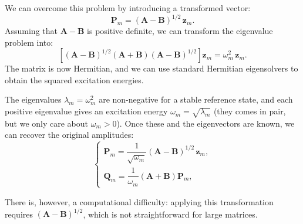 \documentclass[10pt,aspectratio=169]{beamer}
\begin{document}
\begin{frame}
	We can overcome this problem by introducing a transformed vector:
	\begin{equation*}
		\mathbf P_m=(\mathbf A-\mathbf B)^{1/2}\,\mathbf z_m.
	\end{equation*}
	\pause
	Assuming that $\mathbf A-\mathbf B$ is positive definite, we can transform the eigenvalue problem into:
	\begin{equation}
		\boxed{
			\left[(\mathbf A-\mathbf B)^{1/2}(\mathbf A+\mathbf B)(\mathbf A-\mathbf B)^{1/2}\right]\mathbf z_m
			=\omega_m^2\,\mathbf z_m.
		} \label{eq:casida-x}
	\end{equation}
	The matrix is now Hermitian, and we can use standard Hermitian eigensolvers to obtain the squared excitation energies.
	
	\pause
	\medskip
	The eigenvalues $\lambda_m = \omega_m^2$ are non-negative for a stable reference state, and each positive eigenvalue gives an excitation energy $\omega_m=\sqrt{\lambda_m}$ (they comes in pair, but we only care about $\omega_m > 0$).
	Once these and the eigenvectors are known, we can recover the original amplitudes:
	\begin{equation*}
		\begin{cases}
			\mathbf P_m=\dfrac{1}{\sqrt{\omega_m}}(\mathbf A-\mathbf B)^{1/2}\,\mathbf z_m,\\
			\mathbf Q_m=\dfrac{1}{\omega_m}(\mathbf A+\mathbf B)\mathbf P_m,
		\end{cases}
	\end{equation*}
	
	\medskip
	There is, however, a computational difficulty: applying this transformation requires $(\mathbf A-\mathbf B)^{1/2}$, which is not straightforward for large matrices.
\end{frame}
\end{document}
